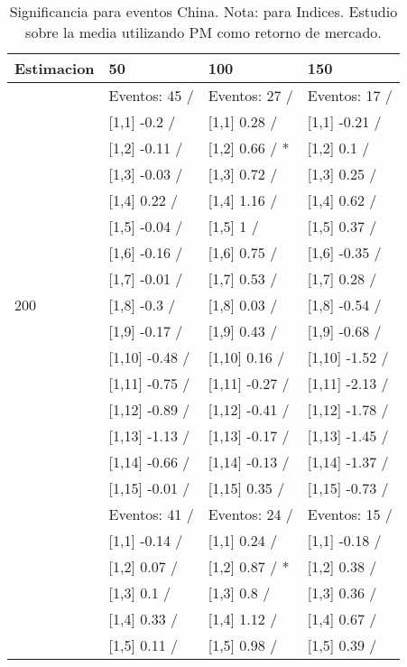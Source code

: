 \begin{table}

\caption{Significancia para eventos China. Nota: para Indices. Estudio sobre la media utilizando PM como retorno de mercado.}
\centering
\begin{tabular}[t]{llll}
\toprule
Estimacion & 50 & 100 & 150\\
\midrule
 & Eventos:  45 / & Eventos:  27 / & Eventos:  17 /\\
 & {}[1,1] -0.2  / & {}[1,1] 0.28  / & {}[1,1] -0.21  /\\
 & {}[1,2] -0.11  / & {}[1,2] 0.66  / * & {}[1,2] 0.1  /\\
 & {}[1,3] -0.03  / & {}[1,3] 0.72  / & {}[1,3] 0.25  /\\
 & {}[1,4] 0.22  / & {}[1,4] 1.16  / & {}[1,4] 0.62  /\\
\addlinespace
 & {}[1,5] -0.04  / & {}[1,5] 1  / & {}[1,5] 0.37  /\\
 & {}[1,6] -0.16  / & {}[1,6] 0.75  / & {}[1,6] -0.35  /\\
 & {}[1,7] -0.01  / & {}[1,7] 0.53  / & {}[1,7] 0.28  /\\
200 & {}[1,8] -0.3  / & {}[1,8] 0.03  / & {}[1,8] -0.54  /\\
 & {}[1,9] -0.17  / & {}[1,9] 0.43  / & {}[1,9] -0.68  /\\
\addlinespace
 & {}[1,10] -0.48  / & {}[1,10] 0.16  / & {}[1,10] -1.52  /\\
 & {}[1,11] -0.75  / & {}[1,11] -0.27  / & {}[1,11] -2.13  /\\
 & {}[1,12] -0.89  / & {}[1,12] -0.41  / & {}[1,12] -1.78  /\\
 & {}[1,13] -1.13  / & {}[1,13] -0.17  / & {}[1,13] -1.45  /\\
 & {}[1,14] -0.66  / & {}[1,14] -0.13  / & {}[1,14] -1.37  /\\
\addlinespace
 & {}[1,15] -0.01  / & {}[1,15] 0.35  / & {}[1,15] -0.73  /\\
 & Eventos:  41 / & Eventos:  24 / & Eventos:  15 /\\
 & {}[1,1] -0.14  / & {}[1,1] 0.24  / & {}[1,1] -0.18  /\\
 & {}[1,2] 0.07  / & {}[1,2] 0.87  / * & {}[1,2] 0.38  /\\
 & {}[1,3] 0.1  / & {}[1,3] 0.8  / & {}[1,3] 0.36  /\\
\addlinespace
 & {}[1,4] 0.33  / & {}[1,4] 1.12  / & {}[1,4] 0.67  /\\
 & {}[1,5] 0.11  / & {}[1,5] 0.98  / & {}[1,5] 0.39  /\\

\end{tabular}
\end{table}
